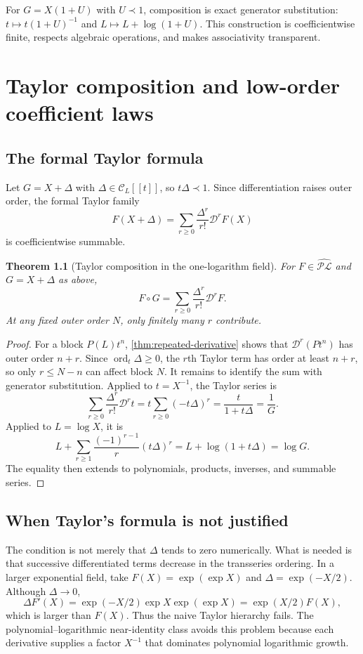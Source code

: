 \documentclass[11pt,oneside]{book}
\newtheorem{theorem}{Theorem}[chapter]
\theoremstyle{definition}
\theoremstyle{remark}
\DeclareMathOperator{\ord}{ord}
\newcommand{\PLfield}{\widehat{\mathscr{PL}}}
\newcommand{\D}{\mathcal D}
\newcommand{\precdom}{\prec}
\newcommand{\compose}{\mathbin{\circ}}
\begin{document}
\begin{summarybox}
For $G=X(1+U)$ with $U\precdom1$, composition is exact generator
substitution:
$t\mapsto t(1+U)^{-1}$ and
$L\mapsto L+\log(1+U)$.  This construction is coefficientwise finite,
respects algebraic operations, and makes associativity transparent.
\end{summarybox}


\chapter{Taylor composition and low-order coefficient laws}
\label{ch:composition-taylor}

\section{The formal Taylor formula}
Let $G=X+\Delta$ with $\Delta\in\mathcal C_L[[t]]$, so
$t\Delta\precdom1$.  Since differentiation raises outer order, the formal
Taylor family
\begin{equation}\label{eq:taylor-composition}
 F(X+\Delta)
 =\sum_{r\ge0}\frac{\Delta^r}{r!}\D^rF(X)
\end{equation}
is coefficientwise summable.

\begin{theorem}[Taylor composition in the one-logarithm field]
\label{thm:taylor-composition}
For $F\in\PLfield$ and $G=X+\Delta$ as above,
\begin{equation}\label{eq:taylor-composition-theorem}
 F\compose G
 =\sum_{r\ge0}\frac{\Delta^r}{r!}\D^rF.
\end{equation}
At any fixed outer order $N$, only finitely many $r$ contribute.
\end{theorem}
\begin{proof}
For a block $P(L)t^n$, \cref{thm:repeated-derivative} shows that
$\D^r(Pt^n)$ has outer order $n+r$.  Since $\ord_t\Delta\ge0$, the $r$th
Taylor term has order at least $n+r$, so only $r\le N-n$ can affect block
$N$.  It remains to identify the sum with generator substitution.  Applied
to $t=X^{-1}$, the Taylor series is
\[
 \sum_{r\ge0}\frac{\Delta^r}{r!}\D^rt
 =t\sum_{r\ge0}(-t\Delta)^r
 =\frac{t}{1+t\Delta}=\frac1G.
\]
Applied to $L=\log X$, it is
\[
 L+\sum_{r\ge1}\frac{(-1)^{r-1}}r(t\Delta)^r
 =L+\log(1+t\Delta)=\log G.
\]
The equality then extends to polynomials, products, inverses, and summable
series.
\end{proof}

\section{When Taylor's formula is not justified}
The condition is not merely that $\Delta$ tends to zero numerically.  What is
needed is that successive differentiated terms decrease in the transseries
ordering.  In a larger exponential field, take $F(X)=\exp(\exp X)$ and
$\Delta=\exp(-X/2)$.  Although $\Delta\to0$,
\[
 \Delta F'(X)=\exp(-X/2)\exp X\exp(\exp X)
 =\exp(X/2)F(X),
\]
which is larger than $F(X)$.  Thus the naive Taylor hierarchy fails.  The
polynomial--logarithmic near-identity class avoids this problem because each
derivative supplies a factor $X^{-1}$ that dominates polynomial logarithmic
growth.
\end{document}
